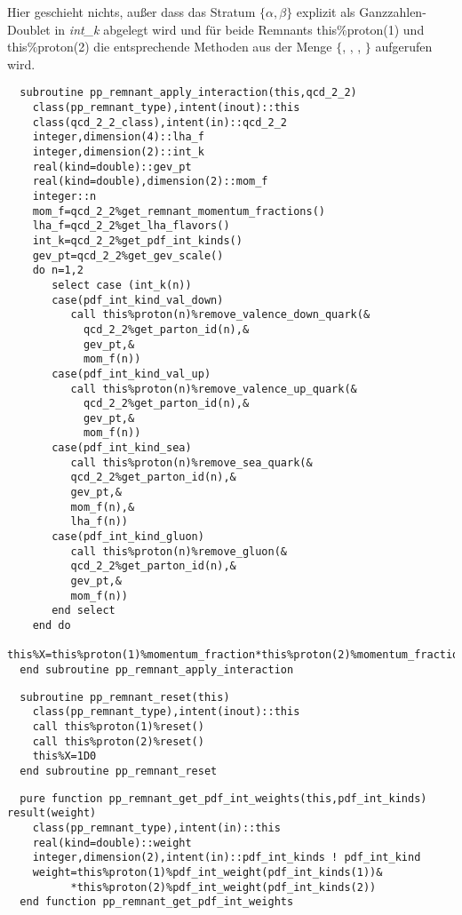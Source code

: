Hier geschieht nichts, außer dass das Stratum $\{\alpha,\beta\}$ explizit als Ganzzahlen-Doublet in \emph{int\_k} abgelegt wird und für beide Remnants this\%proton(1) und this\%proton(2) die entsprechende Methoden aus der Menge $\{$, , , $\}$ aufgerufen wird.
\begin{Verbatim}
  subroutine pp_remnant_apply_interaction(this,qcd_2_2)
    class(pp_remnant_type),intent(inout)::this
    class(qcd_2_2_class),intent(in)::qcd_2_2
    integer,dimension(4)::lha_f
    integer,dimension(2)::int_k
    real(kind=double)::gev_pt
    real(kind=double),dimension(2)::mom_f
    integer::n
    mom_f=qcd_2_2%get_remnant_momentum_fractions()
    lha_f=qcd_2_2%get_lha_flavors()
    int_k=qcd_2_2%get_pdf_int_kinds()
    gev_pt=qcd_2_2%get_gev_scale()
    do n=1,2
       select case (int_k(n))
       case(pdf_int_kind_val_down)
          call this%proton(n)%remove_valence_down_quark(&
            qcd_2_2%get_parton_id(n),&
            gev_pt,&
            mom_f(n))
       case(pdf_int_kind_val_up)
          call this%proton(n)%remove_valence_up_quark(&
            qcd_2_2%get_parton_id(n),&
            gev_pt,&
            mom_f(n))
       case(pdf_int_kind_sea)
          call this%proton(n)%remove_sea_quark(&
          qcd_2_2%get_parton_id(n),&
          gev_pt,&
          mom_f(n),&
          lha_f(n))
       case(pdf_int_kind_gluon)
          call this%proton(n)%remove_gluon(&
          qcd_2_2%get_parton_id(n),&
          gev_pt,&
          mom_f(n))
       end select
    end do
    this%X=this%proton(1)%momentum_fraction*this%proton(2)%momentum_fraction
  end subroutine pp_remnant_apply_interaction
\end{Verbatim}

\begin{Verbatim}
  subroutine pp_remnant_reset(this)
    class(pp_remnant_type),intent(inout)::this
    call this%proton(1)%reset()
    call this%proton(2)%reset()
    this%X=1D0
  end subroutine pp_remnant_reset
\end{Verbatim}

\begin{Verbatim}
  pure function pp_remnant_get_pdf_int_weights(this,pdf_int_kinds) result(weight)
    class(pp_remnant_type),intent(in)::this
    real(kind=double)::weight
    integer,dimension(2),intent(in)::pdf_int_kinds ! pdf_int_kind
    weight=this%proton(1)%pdf_int_weight(pdf_int_kinds(1))&
          *this%proton(2)%pdf_int_weight(pdf_int_kinds(2))
  end function pp_remnant_get_pdf_int_weights
\end{Verbatim}

